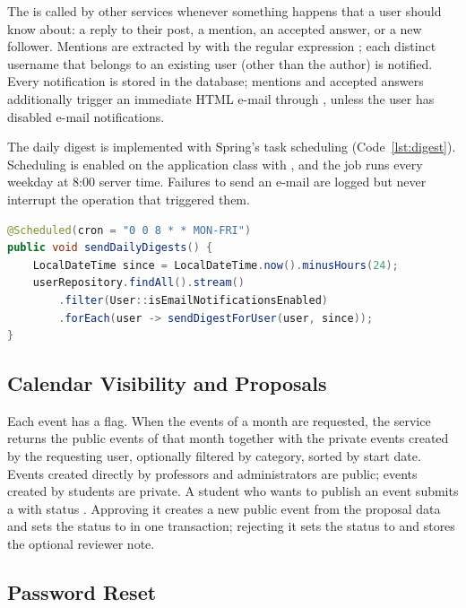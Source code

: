 The  is called by other services whenever something happens
that a user should know about: a reply to their post, a mention, an accepted answer, or
a new follower. Mentions are extracted by  with the regular
expression ; each distinct username that belongs to an existing
user (other than the author) is notified. Every notification is stored in the database;
mentions and accepted answers additionally trigger an immediate HTML e-mail through
, unless the user has disabled e-mail notifications.

The daily digest is implemented with Spring's task scheduling
(Code~\ref{lst:digest}). Scheduling is enabled on the application class with
, and the job runs every weekday at 8:00 server time. Failures to
send an e-mail are logged but never interrupt the operation that triggered them.

\begin{lstlisting}[language=Java,caption={Scheduled daily digest (\texttt{EmailDigestService.java}, abridged)},label={lst:digest}]
@Scheduled(cron = "0 0 8 * * MON-FRI")
public void sendDailyDigests() {
    LocalDateTime since = LocalDateTime.now().minusHours(24);
    userRepository.findAll().stream()
        .filter(User::isEmailNotificationsEnabled)
        .forEach(user -> sendDigestForUser(user, since));
}
\end{lstlisting}

\subsection{Calendar Visibility and Proposals}

Each event has a  flag. When the events of a month are requested, the
service returns the public events of that month together with the private events
created by the requesting user, optionally filtered by category, sorted by start date.
Events created directly by professors and administrators are public; events created by
students are private. A student who wants to publish an event submits a
 with status . Approving it creates a new
public event from the proposal data and sets the status to  in one
transaction; rejecting it sets the status to  and stores the optional
reviewer note.

\subsection{Password Reset}

